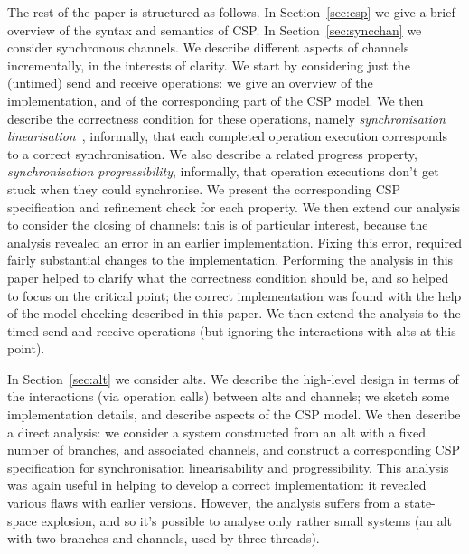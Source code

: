 The rest of the paper is structured as follows.  In Section~\ref{sec:csp} we
give a brief overview of the syntax and semantics of CSP\@.  In
Section~\ref{sec:syncchan} we consider synchronous channels.  We describe
different aspects of channels incrementally, in the interests of clarity.  We
start by considering just the (untimed) send and receive operations: we give
an overview of the implementation, and of the corresponding part of the CSP
model.  We then describe the correctness condition for these operations,
namely \emph{synchronisation linearisation}~\cite{LL:synchronisation},
informally, that each completed operation execution corresponds to a correct
synchronisation.  We also describe a related progress property,
\emph{synchronisation progressibility}, informally, that operation executions
don't get stuck when they could synchronise.  We present the corresponding CSP
specification and refinement check for each property.  We then extend our
analysis to consider the closing of channels: this is of particular interest,
because the analysis revealed an error in an earlier implementation.  Fixing
this error, required fairly substantial changes to the implementation.
Performing the analysis in this paper helped to clarify what the correctness
condition should be, and so helped to focus on the critical point; the correct
implementation was found with the help of the model checking described in this
paper.  We then extend the analysis to the timed send and receive operations
(but ignoring the interactions with alts at this point).

In Section~\ref{sec:alt} we consider alts.  We describe the high-level design
in terms of the interactions (via operation calls) between alts and channels;
we sketch some implementation details, and describe aspects of the CSP model.
We then describe a direct analysis: we consider a system constructed from an
alt with a fixed number of branches, and associated channels, and construct a
corresponding CSP specification for synchronisation linearisability and
progressibility.  This analysis was again useful in helping to develop a
correct implementation: it revealed various flaws with earlier versions.
However, the analysis suffers from a state-space explosion, and so it's
possible to analyse only rather small systems (an alt with two branches and
channels, used by three threads).

